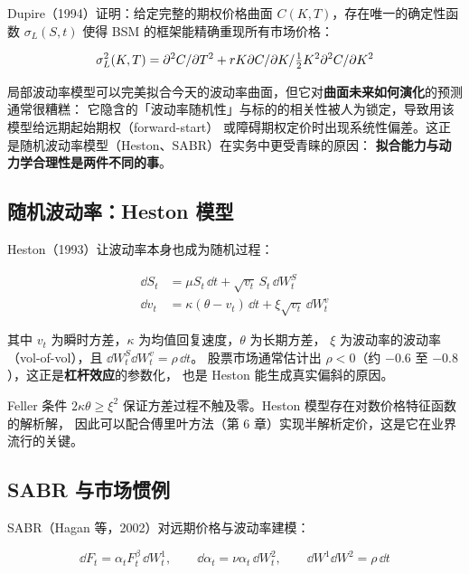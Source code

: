 Dupire（1994）证明：给定完整的期权价格曲面 $C(K,T)$，存在唯一的确定性函数 $\sigma_L(S,t)$
使得 BSM 的框架能精确重现所有市场价格：

\begin{equation}
  \sigma_L^2(K,T) = \partial^2 C/\partial T^2 + rK\partial C/\partial K/\tfrac12K^2\partial^2 C/\partial K^2
  \label{eq:04-dupire}
\end{equation}

\begin{warningbox}
局部波动率模型可以完美拟合今天的波动率曲面，但它对\textbf{曲面未来如何演化}的预测通常很糟糕：
它隐含的「波动率随机性」与标的的相关性被人为锁定，导致用该模型给远期起始期权（forward-start）
或障碍期权定价时出现系统性偏差。这正是随机波动率模型（Heston、SABR）在实务中更受青睐的原因：
\textbf{拟合能力与动力学合理性是两件不同的事}。
\end{warningbox}

\subsection{随机波动率：Heston 模型}

Heston（1993）让波动率本身也成为随机过程：

\begin{align}
  \dd S_t &= \mu S_t\,\dd t + \sqrt{v_t}\,S_t\,\dd W_t^{S} \label{eq:04-heston-s}\\
  \dd v_t &= \kappa(\theta - v_t)\,\dd t + \xi\sqrt{v_t}\,\dd W_t^{v} \label{eq:04-heston-v}
\end{align}

其中 $v_t$ 为瞬时方差，$\kappa$ 为均值回复速度，$\theta$ 为长期方差，
$\xi$ 为波动率的波动率（vol-of-vol），且 $\dd W_t^{S}\dd W_t^{v} = \rho\,\dd t$。
股票市场通常估计出 $\rho < 0$（约 $-0.6$ 至 $-0.8$），这正是\textbf{杠杆效应}的参数化，
也是 Heston 能生成真实偏斜的原因。

Feller 条件 $2\kappa\theta \ge \xi^2$ 保证方差过程不触及零。Heston 模型存在对数价格特征函数的解析解，
因此可以配合傅里叶方法（第 6 章）实现半解析定价，这是它在业界流行的关键。

\subsection{SABR 与市场惯例}

SABR（Hagan 等，2002）对远期价格与波动率建模：

\begin{equation}
  \dd F_t = \alpha_t F_t^{\beta}\,\dd W_t^{1},\qquad
  \dd\alpha_t = \nu\alpha_t\,\dd W_t^{2},\qquad
  \dd W^{1}\dd W^{2} = \rho\,\dd t
  \label{eq:04-sabr}
\end{equation}

